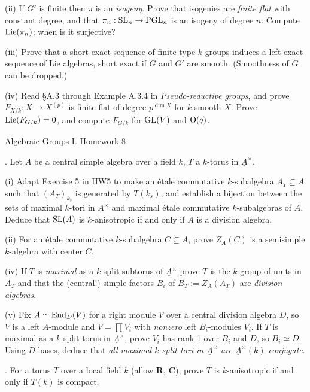 \documentclass[10pt]{amsart}
\begin{document}
(ii) If $G'$ is finite then $\pi$ is an {\em isogeny}.  Prove that isogenies are
{\em finite flat} with constant degree, and that $\pi_n:{\rm{SL}}_n \rightarrow
{\rm{PGL}}_n$ is an isogeny of degree $n$.  Compute ${\rm{Lie}}(\pi_n)$; when is it surjective?

(iii) Prove that a short exact sequence of finite type $k$-groups induces a left-exact sequence
of Lie algebras, short 
exact if $G$ and $G'$ are smooth.  (Smoothness of $G$ can be dropped.)

(iv) Read \S{A}.3 through Example A.3.4 in {\em Pseudo-reductive groups}, 
and prove $F_{X/k}:X \rightarrow X^{(p)}$
is  finite flat of degree $p^{\dim X}$ for $k$-smooth $X$.  
Prove ${\rm{Lie}}(F_{G/k})=0$, and compute $F_{G/k}$ for ${\rm{GL}}(V)$
and ${\rm{O}}(q)$.

\newpage

\centerline{\sc Algebraic Groups I. Homework 8}

\medskip{}. Let $A$ be a central simple algebra over a field $k$, $T$ a $k$-torus in $\underline{A}^{\times}$.

(i) Adapt Exercise 5 in HW5 to make an \'etale commutative $k$-subalgebra $A_T \subseteq A$
such that $(A_T)_{k_s}$ is generated by $T(k_s)$, and establish a bijection 
between the sets of maximal $k$-tori in $\underline{A}^{\times}$ and maximal \'etale commutative $k$-subalgebras of $A$.
Deduce that ${\rm{SL}}(A)$ is $k$-anisotropic if and only if $A$ is a division algebra.

(ii) For an \'etale commutative $k$-subalgebra $C \subseteq A$, prove $Z_A(C)$ is a semisimple $k$-algebra
with center $C$. 

(iv) If $T$ is {\em maximal} as a $k$-split subtorus of $\underline{A}^{\times}$ prove $T$ is the $k$-group of units in $A_T$
and that the (central!) simple factors $B_i$ of $B_T := Z_A(A_T)$ are {\em division 
algebras}.  

(v) Fix $A \simeq {\rm{End}}_D(V)$ for a right module $V$ over a central division algebra $D$, so $V$ is
a left $A$-module and $V = \prod V_i$ with {\em nonzero} left $B_i$-modules $V_i$.
If $T$ is maximal as a $k$-split torus in $\underline{A}^{\times}$, 
prove $V_i$ has rank 1 over $B_i$ and $D$, so $B_i \simeq D$.
Using $D$-bases, deduce that 
{\em all maximal $k$-split tori in $\underline{A}^{\times}$ are $\underline{A}^{\times}(k)$-conjugate}. 

\medskip{}. For a torus $T$ over a local field $k$ (allow $\mathbf{R}$, $\mathbf{C}$), 
prove $T$ is $k$-anisotropic if and only if $T(k)$ is compact.
\end{document}
